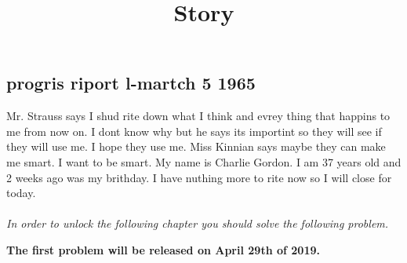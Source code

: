 \documentclass[english,11pt]{article}
\theoremstyle{definition}
\theoremstyle{plain}
\begin{document}
\title{Story}
\maketitle
\begin{center}


\section*{progris riport l-martch 5 1965 }
\end{center}
Mr. Strauss says I shud rite down what I think and evrey thing that happins to me from now on. I dont know why but he says its importint so they will see if they will use me. I hope they use me. Miss Kinnian says maybe they can make me smart. I want to be smart. My name is Charlie Gordon. I am 37 years old and 2 weeks ago was my brithday. I have nuthing more to rite now so I will close for today.
\\ \\
\textit{In order to unlock the following chapter you should solve the following problem.} \\
\begin{center}
\textbf{The first problem will be released on April 29th of 2019.}
\end{center}
\end{document}

